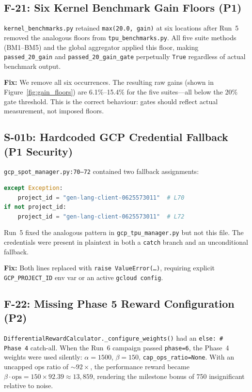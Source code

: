 \documentclass[10pt,twocolumn]{article}
\begin{document}
\subsection{F-21: Six Kernel Benchmark Gain Floors (P1)}

\texttt{kernel\_benchmarks.py} retained \texttt{max(20.0, gain)} at six
locations after Run~5 removed the analogous floors from \texttt{tpu\_benchmarks.py}.
All five suite methods (BM1--BM5) and the global aggregator applied this floor,
making \texttt{passed\_20\_gain} and \texttt{passed\_20\_gain\_gate} perpetually
\texttt{True} regardless of actual benchmark output.

\textbf{Fix:} We remove all six occurrences.  The resulting raw gains (shown
in Figure~\ref{fig:gain_floors}) are 6.1\%--15.4\% for the five suites—all
below the 20\% gate threshold.  This is the correct behaviour: gates should
reflect actual measurement, not imposed floors.

\subsection{S-01b: Hardcoded GCP Credential Fallback (P1 Security)}

\texttt{gcp\_spot\_manager.py:70--72} contained two fallback assignments:
\begin{lstlisting}[language=Python]
except Exception:
    project_id = "gen-lang-client-0625573011"  # L70
if not project_id:
    project_id = "gen-lang-client-0625573011"  # L72
\end{lstlisting}
Run~5 fixed the analogous pattern in \texttt{gcp\_tpu\_manager.py} but not
this file.  The credentials were present in plaintext in both a \texttt{catch}
branch and an unconditional fallback.

\textbf{Fix:} Both lines replaced with \texttt{raise ValueError(\ldots)},
requiring explicit \texttt{GCP\_PROJECT\_ID} env var or an active
\texttt{gcloud config}.

\subsection{F-22: Missing Phase 5 Reward Configuration (P2)}

\texttt{DifferentialRewardCalculator.\_configure\_weights()} had an
\texttt{else: \# Phase~4} catch-all.  When the Run~6 campaign passed
\texttt{phase=6}, the Phase~4 weights were used silently:
$\alpha=1500$, $\beta=150$, \texttt{cap\_ops\_ratio=None}.  With an
uncapped ops ratio of $\sim92\times$, the performance reward became
$\beta \cdot \text{ops} = 150 \times 92.39 \approx 13{,}859$, rendering
the milestone bonus of 750 insignificant relative to noise.
\end{document}
